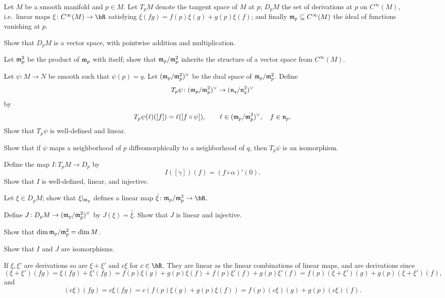 \def\m{{\frak m}}
\def\n{{\frak n}}

\bprob

    Let $M$ be a smooth manifold and $p\in M$.
    Let $T_pM$ denote the tangent space of $M$ at $p$; $D_pM$ the set of {\emphcolor derivations} at $p$ on $C^\infty(M)$,
    i.e.\ linear maps $\xi\colon C^\infty(M)\to\bR$ satisfying $\xi(fg)=f(p)\xi(g)+g(p)\xi(f)$; and finally
    $\m_p\subseteq C^\infty(M)$ the ideal of functions vanishing at $p$.
    \benum
        \item Show that $D_pM$ is a vector space, with pointwise addition and multiplication.

        \item Let $\m_p^2$ be the product of $\m_p$ with itself; show that $\m_p/\m_p^2$ inherits the structure of a vector
        space from $C^\infty(M)$.

        \item Let $\psi\colon M\to N$ be smooth such that $\psi(p)=q$.
        Let $(\m_p/\m_p^2)^\vee$ be the dual space of $\m_p/\m_p^2$.
        Define
        $$ T_p\psi \colon (\m_p/\m_p^2)^\vee \to (\n_q/\n_q^2)^\vee $$
        by
        $$ T_p\psi(\ell)([f]) = \ell([f\circ\psi]),\qquad \ell\in(\m_p/\m_p^2)^\vee,\quad f\in\n_p . $$
        Show that $T_p\psi$ is well-defined and linear.

        \item Show that if $\psi$ maps a neighborhood of $p$ diffeomorphically to a neighborhood of $q$, then
        $T_p\psi$ is an isomorphism.

        \item Define the map $I\colon T_pM\to D_p$ by
        $$ I([\gamma])(f) = (f\circ\alpha)'(0) . $$
        Show that $I$ is well-defined, linear, and injective.

        \item Let $\xi\in D_pM$; show that $\xi|_{\m_p}$ defines a linear map $\hat\xi\colon\m_p/\m_p^2\to\bR$.

        \item Define $J\colon D_pM\to(\m_p/\m_p^2)^\vee$ by $J(\xi)=\hat\xi$.
        Show that $J$ is linear and injective.

        \item Show that $\dim\m_p/\m_p^2=\dim M$.

        \item Show that $I$ and $J$ are isomorphisms.
    \eenum

\eprob

\benum
    \item If $\xi,\xi'$ are derivations so are $\xi+\xi'$ and $c\xi$ for $c\in\bR$.
    They are linear as the linear combinations of linear maps, and are derivations since
    $$ (\xi+\xi')(fg) = \xi(fg) + \xi'(fg) = f(p)\xi(g) + g(p)\xi(f) + f(p)\xi'(f) + g(p)\xi'(f)
    = f(p)(\xi+\xi')(g) + g(p)(\xi+\xi')(f) , $$
    and
    $$ (c\xi)(fg) = c\xi(fg) = c(f(p)\xi(g) + g(p)\xi(f)) = f(p)(c\xi)(g) + g(p)(c\xi)(f) . $$

